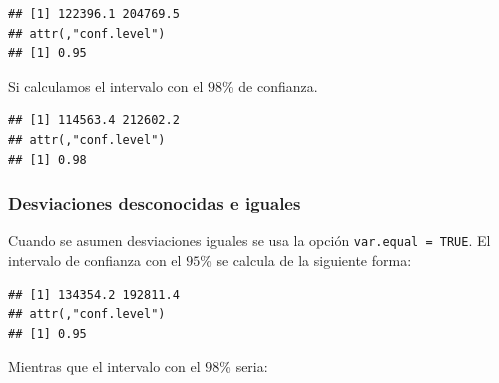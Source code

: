 \documentclass[letterpaper,]{book}
\newenvironment{Shaded}{\begin{snugshade}}{\end{snugshade}}
\newcommand{\DataTypeTok}[1]{\textcolor[rgb]{0.13,0.29,0.53}{#1}}
\newcommand{\FloatTok}[1]{\textcolor[rgb]{0.00,0.00,0.81}{#1}}
\newcommand{\KeywordTok}[1]{\textcolor[rgb]{0.13,0.29,0.53}{\textbf{#1}}}
\newcommand{\NormalTok}[1]{#1}
\newcommand{\OperatorTok}[1]{\textcolor[rgb]{0.81,0.36,0.00}{\textbf{#1}}}
\newcommand{\OtherTok}[1]{\textcolor[rgb]{0.56,0.35,0.01}{#1}}
\begin{document}
\begin{verbatim}
## [1] 122396.1 204769.5
## attr(,"conf.level")
## [1] 0.95
\end{verbatim}

Si calculamos el intervalo con el \(98\)\% de confianza.

\begin{Shaded}
\end{Shaded}

\begin{verbatim}
## [1] 114563.4 212602.2
## attr(,"conf.level")
## [1] 0.98
\end{verbatim}

\hypertarget{desviaciones-desconocidas-e-iguales-1}{%
\subsubsection{Desviaciones desconocidas e iguales}\label{desviaciones-desconocidas-e-iguales-1}}

Cuando se asumen desviaciones iguales se usa la opción \texttt{var.equal\ =\ TRUE}. El intervalo de confianza con el \(95\)\% se calcula de la siguiente forma:

\begin{Shaded}
\end{Shaded}

\begin{verbatim}
## [1] 134354.2 192811.4
## attr(,"conf.level")
## [1] 0.95
\end{verbatim}

Mientras que el intervalo con el \(98\)\% seria:

\begin{Shaded}
\end{Shaded}
\end{document}
